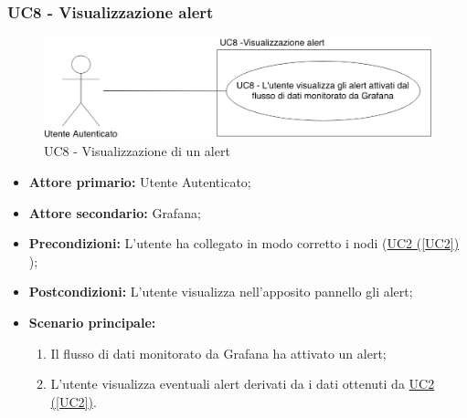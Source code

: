 \pagebreak

\subsubsection{UC8 - Visualizzazione alert}\label{UC8}

\begin{figure}[H]
	\centering
	\includegraphics[scale=0.4]{./images/UC8.png}
	\caption{UC8 - Visualizzazione di un alert}
\end{figure}

\begin{itemize}
	\item \textbf{Attore primario:} Utente Autenticato;
	\item \textbf{Attore secondario:} Grafana;
	\item \textbf{Precondizioni:} L'utente ha collegato in modo corretto i nodi (\hyperref[UC2]{UC2 (\ref*{UC2})} );
	\item \textbf{Postcondizioni:} L'utente visualizza nell'apposito pannello gli alert;
	\item \textbf{Scenario principale:}
	\begin{enumerate}
		\item Il flusso di dati monitorato da Grafana ha attivato un alert;
		\item L'utente visualizza eventuali alert derivati da i dati ottenuti da  \hyperref[UC2]{UC2 (\ref*{UC2})}.
	\end{enumerate}
\end{itemize}
